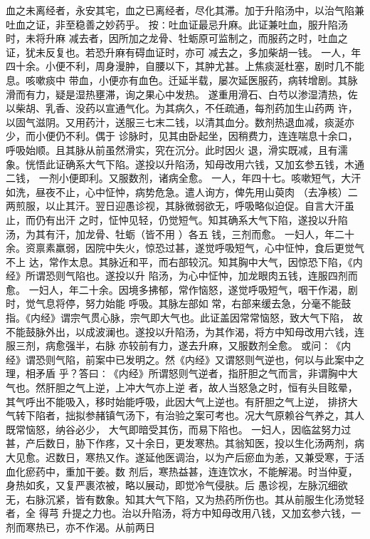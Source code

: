 \documentclass[a4paper,12pt,UTF8,twoside]{ctexbook}
\begin{document}
血之未离经者，永安其宅，血之已离经者，尽化其滞。加于升陷汤中，以治气陷兼吐血之证，非至稳善之妙药乎。 
按∶吐血证最忌升麻。此证兼吐血，服升陷汤时，未将升麻 
减去者，因所加之龙骨、牡蛎原可监制之，而服药之时，吐血之证，犹未反复也。若恐升麻有碍血证时，亦可 
减去之，多加柴胡一钱。 
一人，年四十余。小便不利，周身漫肿，自腰以下，其肿尤甚。上焦痰涎杜塞，剧时几不能息。咳嗽痰中 
带血，小便亦有血色。迁延半载，屡次延医服药，病转增剧。其脉滑而有力，疑是湿热壅滞，询之果心中发热。 
遂重用滑石、白芍以渗湿清热，佐以柴胡、乳香、没药以宣通气化。为其病久，不任疏通，每剂药加生山药两 
许，以固气滋阴。又用药汁，送服三七末二钱，以清其血分。数剂热退血减，痰涎亦少，而小便仍不利。偶于 
诊脉时，见其由卧起坐，因稍费力，连连喘息十余口，呼吸始顺。且其脉从前虽然滑实，究在沉分。此时因火 
退，滑实既减，且有濡象。恍悟此证确系大气下陷。遂投以升陷汤，知母改用六钱，又加玄参五钱，木通二钱， 
一剂小便即利。又服数剂，诸病全愈。 
一人，年四十七。咳嗽短气，大汗如洗，昼夜不止，心中怔忡，病势危急。遣人询方，俾先用山萸肉 
（去净核）二两煎服，以止其汗。翌日迎愚诊视，其脉微弱欲无，呼吸略似迫促。自言大汗虽止，而仍有出汗 
之时，怔忡见轻，仍觉短气。知其确系大气下陷，遂投以升陷汤，为其有汗，加龙骨、牡蛎（皆不用 ）各五 
钱，三剂而愈。 
一妇人，年二十余。资禀素羸弱，因院中失火，惊恐过甚，遂觉呼吸短气，心中怔忡，食后更觉气不上 
达，常作太息。其脉近和平，而右部较沉。知其胸中大气，因惊恐下陷，《内经》所谓恐则气陷也。遂投以升 
陷汤，为心中怔忡，加龙眼肉五钱，连服四剂而愈。 
一妇人，年二十余。因境多拂郁，常作恼怒，遂觉呼吸短气，咽干作渴，剧时，觉气息将停，努力始能 
呼吸。其脉左部如 
常，右部来缓去急，分毫不能鼓指。《内经》谓宗气贯心脉，宗气即大气也。此证盖因常常恼怒，致大气下陷， 
故不能鼓脉外出，以成波澜也。遂投以升陷汤，为其作渴，将方中知母改用六钱，连服三剂，病愈强半，右脉 
亦较前有力，遂去升麻，又服数剂全愈。 
或问∶《内经》谓恐则气陷，前案中已发明之。然《内经》又谓怒则气逆也，何以与此案中之理，相矛盾 
乎？答曰∶《内经》所谓怒则气逆者，指肝胆之气而言，非谓胸中大气也。然肝胆之气上逆，上冲大气亦上逆 
者，故人当怒急之时，恒有头目眩晕，其气呼出不能吸入，移时始能呼吸，此因大气上逆也。有肝胆之气上逆， 
排挤大气转下陷者，拙拟参赭镇气汤下，有治验之案可考也。况大气原赖谷气养之，其人既常恼怒，纳谷必少， 
大气即暗受其伤，而易下陷也。 
一妇人，因临盆努力过甚，产后数日，胁下作疼，又十余日，更发寒热。其翁知医，投以生化汤两剂，病 
大见愈。迟数日，寒热又作。遂延他医调治，以为产后瘀血为恙，又兼受寒，于活血化瘀药中，重加干姜。数 
剂后，寒热益甚，连连饮水，不能解渴。时当仲夏，身热如炙，又复严裹浓被，略以展动，即觉冷气侵肤。后 
愚诊视，左脉沉细欲无，右脉沉紧，皆有数象。知其大气下陷，又为热药所伤也。其从前服生化汤觉轻者，全 
得芎 升提之力也。治以升陷汤，将方中知母改用八钱，又加玄参六钱，一剂而寒热已，亦不作渴。从前两日 
\end{document}
